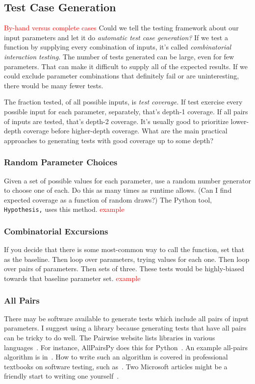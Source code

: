 \documentclass[fleqn,10pt]{olplainarticle}
\newcommand{\aside}[1]{\textcolor{red}{#1}}
\begin{document}
\subsection{Test Case Generation}
\aside{By-hand versus complete cases}
Could we tell the testing framework about our input parameters
and let it do \emph{automatic test case generation?}
If we test a function by supplying every combination of inputs,
it's called \emph{combinatorial interaction testing.}
The number of tests generated can be large, even for few parameters.
That can make it difficult to supply all of the expected results.
If we could exclude parameter combinations that definitely fail
or are uninteresting, there would be many fewer tests.

The fraction tested, of all possible inputs, is \emph{test coverage.}
If test exercise every possible input for each parameter, separately,
that's depth-1 coverage. If all pairs of inputs are tested, that's
depth-2 coverage. It's usually good to prioritize lower-depth coverage
before higher-depth coverage. What are the main practical
approaches to generating tests with good coverage up to some depth?

\subsubsection{Random Parameter Choices}
Given a set of possible values for each parameter, use a random
number generator to choose one of each. Do this as many times
as runtime allows. (Can I find expected coverage as a function of
random draws?) The Python tool, \texttt{Hypothesis,} uses this
method. \aside{example}

\subsubsection{Combinatorial Excursions}
If you decide that there is some most-common way to call
the function, set that as the baseline. Then loop over parameters,
trying values for each one. Then loop over pairs of parameters.
Then sets of three. These tests would be highly-biased
towards that baseline parameter set. \aside{example}

\subsubsection{All Pairs}
There may be software available to generate tests which
include all pairs of input parameters.
I suggest using a library because generating tests that have
all pairs can be tricky to do well.
The Pairwise website lists libraries in
various languages~\cite{Pairwise}. For instance, AllPairsPy
does this for Python~\cite{allpairspy}.
An example all-pairs algorithm is in~\citet{tung2000automating}.
How to write such an algorithm is covered in professional
textbooks on software testing, such as~\citet{pezze2008}.
Two Microsoft articles might be a friendly start to writing
one yourself~\citep{blass2002,czerwoka2006}.
\end{document}
